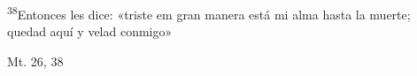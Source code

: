 \documentclass[../../rosario.tex]{subfiles}
\begin{document}
    \textsuperscript{38}Entonces les dice: «triste em gran manera está mi alma hasta la muerte; quedad aquí y velad conmigo»
    \begin{flushright}
    Mt. 26, 38
    \end{flushright}
\end{document}
